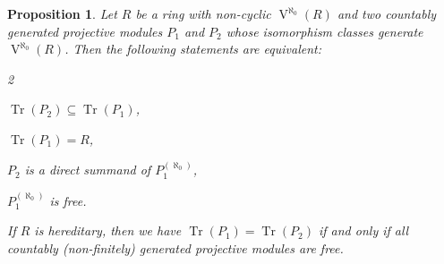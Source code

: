 \documentclass[a4paper,11pt,oneside]{amsart}
\newtheorem{prop}[teor]{Proposition}
\theoremstyle{remark}
\DeclareMathOperator{\Tr}{Tr}
\DeclareMathOperator{\Vmon}{V}
\begin{document}
\begin{prop} \label{traceideal}
  Let $R$ be a ring with non-cyclic $\Vmon^{\aleph_0}(R)$ and two countably generated projective modules $P_1$ and $P_2$ whose isomorphism classes generate $\Vmon^{\aleph_0}(R)$.
  Then the following statements are equivalent:
  \begin{multicols}{2}
  \noindent
  \begin{equivenumerate}
  \item \label{trace:ji} $\Tr(P_2) \subseteq \Tr(P_1)$,
  \item \label{trace:ir} $\Tr(P_1)=R$,
  \item \label{trace:summand} $P_2$ is a direct summand of $P_1^{(\aleph_0)}$,
  \item \label{trace:free} $P_1^{(\aleph_0)}$ is free.
  \end{equivenumerate}
\end{multicols}
\noindent
If $R$ is hereditary, then we have $\Tr(P_1)=\Tr(P_2)$ if and only if all countably \textup(non-finitely\textup) generated projective modules are free.
\end{prop} 
\end{document}
